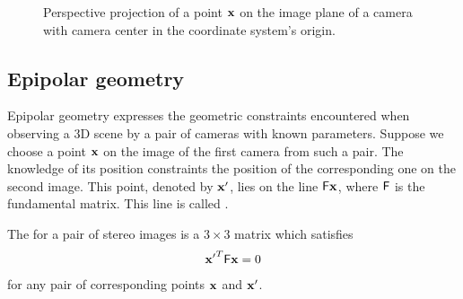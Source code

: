 \begin{figure}[h]
  \label{fig:camera}
  \caption{Perspective projection of a point $\mathbf{x}$ on the image plane of a camera with camera center in the coordinate system's origin. }
\end{figure}

\subsection{Epipolar geometry}
\label{sec:epi}

Epipolar geometry expresses the geometric constraints encountered when observing a 3D scene by a pair of cameras with known parameters. 
Suppose we choose a point $\mathbf{x}$ on the image of the first camera from such a pair.
The knowledge of its position constraints the position of the corresponding one on the second image.
This point, denoted by $\mathbf{x'}$, lies on the line $\mathsf{F}\mathbf{x}$, where $\mathsf{F}$ is the fundamental matrix.
This line is called .

\begin{definition}
The  for a pair of stereo images is a $3 \times 3$ matrix which satisfies 
\begin{align*}
\mathbf{x'}^T \mathsf{F} \mathbf{x} = 0
\end{align*}
for any pair of corresponding points $\mathbf{x}$ and $\mathbf{x'}$.
\end{definition}

